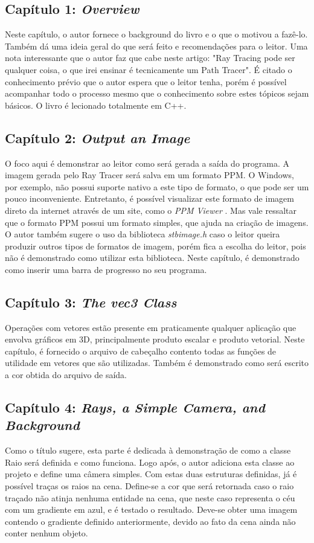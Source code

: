 \documentclass[journal]{IEEEtran}
\begin{document}
\subsection*{Capítulo 1: \emph{Overview}}
Neste capítulo, o autor fornece o background do livro e o que o motivou a fazê-lo. 
Também dá uma ideia geral do que será feito e recomendações para o leitor. Uma nota
interessante que o autor faz que cabe neste artigo: "Ray Tracing pode ser qualquer coisa,
o que irei ensinar é tecnicamente um Path Tracer". É citado o conhecimento prévio que o
autor espera que o leitor tenha, porém é possível acompanhar todo o processo mesmo que
o conhecimento sobre estes tópicos sejam básicos. O livro é lecionado totalmente em C++.

\subsection*{Capítulo 2: \emph{Output an Image}}
O foco aqui é demonstrar ao leitor como será gerada a saída do programa. A imagem gerada
pelo Ray Tracer será salva em um formato PPM. O Windows, por exemplo, não possui suporte
nativo a este tipo de formato, o que pode ser um pouco inconveniente. Entretanto, é possível
visualizar este formato de imagem direto da internet através de um site, como o \emph{PPM Viewer}
\cite{PPMviewer}. Mas vale ressaltar que o formato PPM possui um formato simples, que ajuda
na criação de imagens. O autor também sugere o uso da biblioteca \emph{stb\textunderscore image.h}
\cite{stb-rep} caso o leitor queira produzir outros tipos de formatos de imagem, porém fica a
escolha do leitor, pois não é demonstrado como utilizar esta biblioteca. Neste capítulo, é
demonstrado como inserir uma barra de progresso no seu programa.

\subsection*{Capítulo 3: \emph{The vec3 Class}}
Operações com vetores estão presente em praticamente qualquer aplicação que envolva gráficos em 3D,
principalmente produto escalar e produto vetorial. Neste capítulo, é fornecido o arquivo de 
cabeçalho contento todas as funções de utilidade em vetores que são utilizadas. Também é demonstrado
como será escrito a cor obtida do arquivo de saída.

\subsection*{Capítulo 4: \emph{Rays, a Simple Camera, and Background}}
Como o título sugere, esta parte é dedicada à demonstração de como a classe Raio será definida e
como funciona. Logo após, o autor adiciona esta classe ao projeto e define uma câmera simples.
Com estas duas estruturas definidas, já
é possível traças os raios na cena. Define-se a cor que será retornada caso o raio traçado não
atinja nenhuma entidade na cena, que neste caso representa o céu com um gradiente em azul, e é testado
o resultado. Deve-se obter uma imagem contendo o gradiente definido anteriormente, devido ao fato
da cena ainda não conter nenhum objeto.
\end{document}
